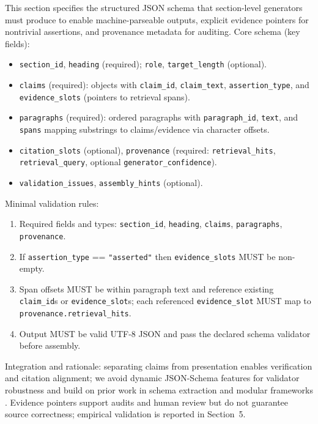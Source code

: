 This section specifies the structured JSON schema that section-level generators must produce to enable machine-parseable outputs, explicit evidence pointers for nontrivial assertions, and provenance metadata for auditing.
Core schema (key fields):
\begin{itemize}
\item \texttt{section\_id}, \texttt{heading} (required); \texttt{role}, \texttt{target\_length} (optional).
\item \texttt{claims} (required): objects with \texttt{claim\_id}, \texttt{claim\_text}, \texttt{assertion\_type}, and \texttt{evidence\_slots} (pointers to retrieval spans).
\item \texttt{paragraphs} (required): ordered paragraphs with \texttt{paragraph\_id}, \texttt{text}, and \texttt{spans} mapping substrings to claims/evidence via character offsets.
\item \texttt{citation\_slots} (optional), \texttt{provenance} (required: \texttt{retrieval\_hits}, \texttt{retrieval\_query}, optional \texttt{generator\_confidence}).
\item \texttt{validation\_issues}, \texttt{assembly\_hints} (optional).
\end{itemize}
Minimal validation rules:
\begin{enumerate}
\item Required fields and types: \texttt{section\_id}, \texttt{heading}, \texttt{claims}, \texttt{paragraphs}, \texttt{provenance}.
\item If \texttt{assertion\_type} == \texttt{"asserted"} then \texttt{evidence\_slots} MUST be non-empty.
\item Span offsets MUST be within paragraph text and reference existing \texttt{claim\_id}s or \texttt{evidence\_slot}s; each referenced \texttt{evidence\_slot} MUST map to \texttt{provenance.retrieval\_hits}.
\item Output MUST be valid UTF-8 JSON and pass the declared schema validator before assembly.
\end{enumerate}
Integration and rationale: separating claims from presentation enables verification and citation alignment; we avoid dynamic JSON-Schema features for validator robustness \cite{web_attouche_2025_elimination_of_annotation_dependencies_in_valida} and build on prior work in schema extraction and modular frameworks \cite{web_li_2020_schema_extraction_on_semi_structured_data,web_wang_2025_llmatch_a_unified_schema_matching_framework_with}. Evidence pointers support audits and human review but do not guarantee source correctness; empirical validation is reported in Section~5.